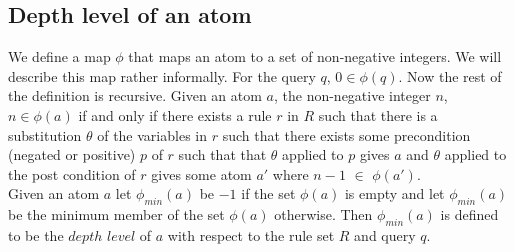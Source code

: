 \documentclass{article}
\begin{document}
\subsection{Depth level of an atom}
We define a map $\phi$ that maps an atom to a set of non-negative integers. We will describe this map rather informally. For the query $q$, $0\in \phi(q)$. Now the rest of the definition is recursive. Given an atom $a$, the non-negative integer $n$, $n\in \phi(a)$ if and only if there exists a rule $r$ in $R$ such that there is a substitution $\theta$ of the variables in $r$ such that there exists some precondition (negated or positive) $p$ of $r$ such that that $\theta$ applied to $p$ gives $a$ and $\theta$ applied to the post condition of $r$ gives some atom $a'$ where $n-1$ $\in$ $\phi(a')$. \\
\newline
Given an atom $a$ let $\phi_{min}(a)$ be $-1$ if the set $\phi(a)$ is empty and let $\phi_{min}(a)$ be the minimum member of the set $\phi(a)$ otherwise. Then $\phi_{min}(a)$ is defined to be the $depth$ $level$ of $a$ with respect to the rule set $R$ and query $q$.  
\end{document}
